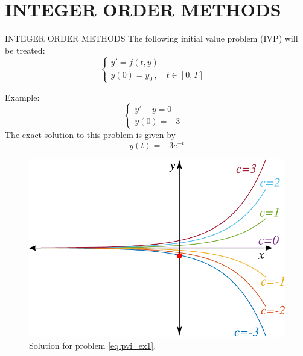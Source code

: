 \section{INTEGER ORDER METHODS}
\begin{frame}{INTEGER ORDER METHODS}
    The following initial value problem (IVP) will be treated:
    \begin{equation}
        \begin{cases}
        y'=f\left(t,y\right)&
        \\y(0)=y_0\,,\quad t\in[0,T]&
        \end{cases}
    \end{equation}
    \begin{multicols}{2}
    Example:
    \begin{equation}\label{eq:pvi_ex1}
        \begin{cases}
            y'-y=0&\\
            y(0)=-3&
        \end{cases}
    \end{equation}
    The exact solution to this problem is given by
    \begin{equation}
        y(t)=-3e^{-t}
    \end{equation}
    
    \columnbreak
    \begin{figure}[H]
        \centering
        \includegraphics[scale=0.4]{files/ex_ivp_1.pdf}
        \caption{Solution for problem \ref{eq:pvi_ex1}.}
    \end{figure}
    \end{multicols}
\end{frame}



